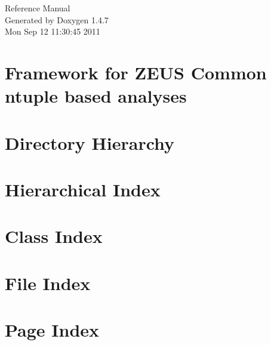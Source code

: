 \documentclass[a4paper]{book}
\begin{document}
\begin{titlepage}
\vspace*{7cm}
\begin{center}
{\Large Reference Manual}\\
\vspace*{1cm}
{\large Generated by Doxygen 1.4.7}\\
\vspace*{0.5cm}
{\small Mon Sep 12 11:30:45 2011}\\
\end{center}
\end{titlepage}
\clearemptydoublepage
{}
\tableofcontents
\clearemptydoublepage
{}
\chapter{Framework for ZEUS Common ntuple based analyses }
\label{index}
\chapter{Directory Hierarchy}

\chapter{Hierarchical Index}

\chapter{Class Index}

\chapter{File Index}

\chapter{Page Index}

\end{document}
